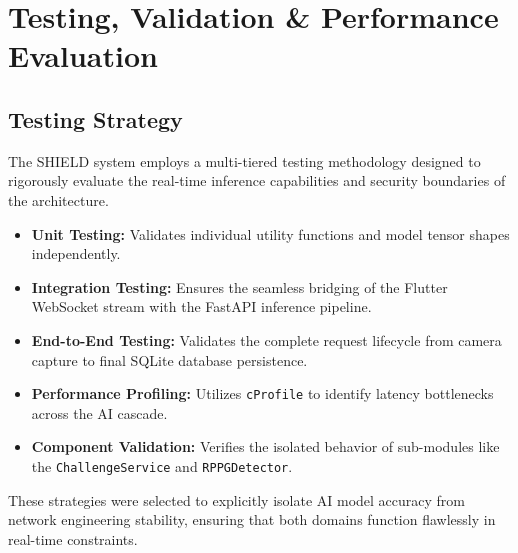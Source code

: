 \chapter{Testing, Validation \& Performance Evaluation}

\section{Testing Strategy}
The SHIELD system employs a multi-tiered testing methodology designed to rigorously evaluate the real-time inference capabilities and security boundaries of the architecture.
\begin{itemize}
    \item \textbf{Unit Testing:} Validates individual utility functions and model tensor shapes independently.
    \item \textbf{Integration Testing:} Ensures the seamless bridging of the Flutter WebSocket stream with the FastAPI inference pipeline.
    \item \textbf{End-to-End Testing:} Validates the complete request lifecycle from camera capture to final SQLite database persistence.
    \item \textbf{Performance Profiling:} Utilizes \texttt{cProfile} to identify latency bottlenecks across the AI cascade.
    \item \textbf{Component Validation:} Verifies the isolated behavior of sub-modules like the \texttt{ChallengeService} and \texttt{RPPGDetector}.
\end{itemize}
These strategies were selected to explicitly isolate AI model accuracy from network engineering stability, ensuring that both domains function flawlessly in real-time constraints.

